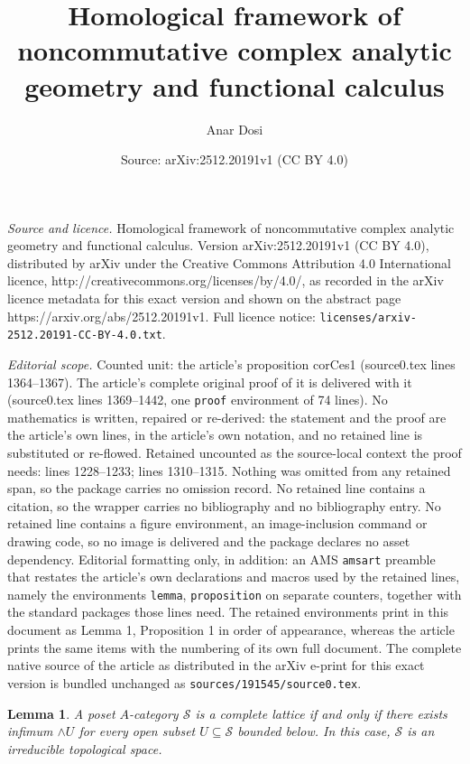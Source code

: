 \documentclass[10pt,a4paper]{amsart}
\title{Homological framework of noncommutative complex analytic geometry and functional calculus}
\author{Anar Dosi}
\date{Source: arXiv:2512.20191v1 (CC BY 4.0)}
\newtheorem{lemma}{Lemma}
\begin{document}
\maketitle

\noindent\emph{Source and licence.} Homological framework of noncommutative complex analytic geometry and functional calculus. Version arXiv:2512.20191v1 (CC BY 4.0), distributed by arXiv under the Creative Commons Attribution 4.0 International licence, http://creativecommons.org/licenses/by/4.0/, as recorded in the arXiv licence metadata for this exact version and shown on the abstract page https://arxiv.org/abs/2512.20191v1. Full licence notice: \texttt{licenses/arxiv-2512.20191-CC-BY-4.0.txt}.\par\smallskip

\noindent\textit{Editorial scope.} Counted unit: the article's proposition corCes1 (source0.tex lines 1364--1367). The article's complete original proof of it is delivered with it (source0.tex lines 1369--1442, one \texttt{proof} environment of 74 lines). No mathematics is written, repaired or re-derived: the statement and the proof are the article's own lines, in the article's own notation, and no retained line is substituted or re-flowed.  Retained uncounted as the source-local context the proof needs: lines 1228--1233; lines 1310--1315.  Nothing was omitted from any retained span, so the package carries no omission record.  No retained line contains a citation, so the wrapper carries no bibliography and no bibliography entry.  No retained line contains a figure environment, an image-inclusion command or drawing code, so no image is delivered and the package declares no asset dependency.  Editorial formatting only, in addition: an AMS \texttt{amsart} preamble that restates the article's own declarations and macros used by the retained lines, namely the environments \texttt{lemma}, \texttt{proposition} on separate counters, together with the standard packages those lines need.  The retained environments print in this document as Lemma 1, Proposition 1 in order of appearance, whereas the article prints the same items with the numbering of its own full document.  The complete native source of the article as distributed in the arXiv e-print for this exact version is bundled unchanged as \texttt{sources/191545/source0.tex}.
\begin{lemma}
\label{lemCes1}A poset $A$-category $\mathcal{S}$ is a complete lattice if and
only if there exists infimum $\wedge U$ for every open subset $U\subseteq
\mathcal{S}$ bounded below. In this case, $\mathcal{S}$ is an irreducible
topological space.
\end{lemma}
\end{document}
